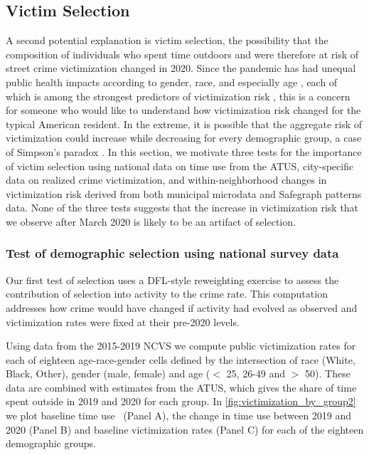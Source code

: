 \subsection{Victim Selection} \label{sec:selection}
A second potential explanation is victim selection, the possibility that the composition of individuals who spent time outdoors and were therefore at risk of street crime victimization changed in 2020. Since the pandemic has had unequal public health impacts according to gender, race, and especially age \citep[e.g.][]{hutchins2020covid, miller2021estimated}, each of which is among the strongest predictors of victimization risk \citep[e.g.][]{perkins1997age}, this is a concern for someone who would like to understand how victimization risk changed for the typical American resident. In the extreme, it is possible that the aggregate risk of victimization could increase while decreasing for every demographic group, a case of Simpson's paradox \citep{blyth1972simpson}. In this section, we motivate three tests for the importance of victim selection using national data on time use from the ATUS, city-specific data on realized crime victimization, and within-neighborhood changes in victimization risk derived from both municipal microdata and Safegraph patterns data. None of the three tests suggests that the increase in victimization risk that we observe after March 2020 is likely to be an artifact of selection.

\subsubsection{Test of demographic selection using national survey data} \label{sec:demog_selection}
Our first test of selection uses a DFL-style reweighting exercise \citep{dinardo1996labor} to assess the contribution of selection into activity to the crime rate. This computation addresses how crime would have changed if activity had evolved as observed and victimization rates were fixed at their pre-2020 levels. 

Using data from the 2015-2019 NCVS we compute public victimization rates for each of eighteen age-race-gender cells defined by the intersection of race (White, Black, Other), gender (male, female) and age ($<$ 25, 26-49 and $>$ 50).%
These data are combined with estimates from the ATUS, which gives the share of time spent outside in 2019 and 2020 for each group. In \autoref{fig:victimization_by_group2} we plot baseline time use  (Panel A), the change in time use between 2019 and 2020 (Panel B) and baseline victimization rates (Panel C) for each of the eighteen demographic groups. 

